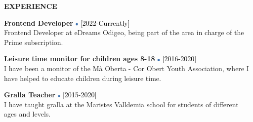 \documentclass[../main.tex]{subfiles}
\begin{document}
    \vspace*{0.25cm}
    \textbf{\textcolor{myCV2}{EXPERIENCE\underline{\hspace{7.1cm}}}}
        \vspace*{0.3cm}
        
        \textbf{Frontend Developer}
        \includegraphics[width=0.15cm]{assets/full.png} 
        \textcolor{black}{[2022-Currently]}\\
        Frontend Developer at eDreams Odigeo, being part of the area in charge of the Prime subscription.
        
        \vspace*{0.25cm}
        \textbf{Leisure time monitor for children ages 8-18}
        \includegraphics[width=0.15cm]{assets/full.png}
        \textcolor{black}{[2016-2020]}\\
        I have been a monitor of the Mà Oberta - Cor Obert Youth Association, where I have helped to educate children during leisure time.
        
        \vspace*{0.25cm}
        \textbf{Gralla Teacher}
        \includegraphics[width=0.15cm]{assets/full.png}
        \textcolor{black}{[2015-2020]} \\
        I have taught gralla at the Maristes Valldemia school for students of different ages and levels.
        

\end{document}
